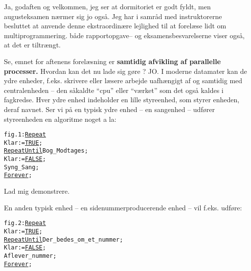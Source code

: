 \documentclass[a4paper,11pt]{article}
\begin{document}
\begin{sketch}





Ja, godaften og velkommen, jeg ser at dormitoriet er godt fyldt, men
augusteksamen nærmer sig jo også. Jeg har i samråd med instruktorerne besluttet
at anvende denne ekstraordinære lejlighed til at forelæse lidt om
multiprogrammering. både rapportopgave-- og eksamensbesvarelserne viser også, at
det er tiltrængt.

Se, emnet for aftenens forelæsning er \textbf{samtidig afvikling af parallelle
  processer.}  Hvordan kan det nu lade sig gøre ?  JO.  I moderne datamater kan
de ydre enheder, f.eks. skrivere eller læsere arbejde uafhængigt af og samtidig
med centralenheden -- den såkaldte ``cpu'' eller ``værket'' som det også kaldes
i fagkredse. Hver ydre enhed indeholder en lille styreenhed, som styrer enheden,
deraf navnet. Ser vi på en typisk ydre enhed -- en sangenhed -- udfører
styreenheden en algoritme noget a la:
\begin{alltt}
fig.1:    \underline{Repeat}
               Klar := \underline{TRUE};
               \underline{Repeat} \underline{Until} Bog_Modtages;
               Klar := \underline{FALSE};
               Syng_Sang;
          \underline{Forever};
\end{alltt}

Lad mig demonstrere.


En anden typisk enhed -- en sidenummerproducerende enhed -- vil f.eks. udføre:
\begin{alltt}
fig.2:    \underline{Repeat}
               Klar := \underline{TRUE};
               \underline{Repeat} \underline{Until} Der_bedes_om_et_nummer;
               Klar := \underline{FALSE};
               Aflever_nummer;
          \underline{Forever};
\end{alltt}


\end{sketch}
\end{document}

